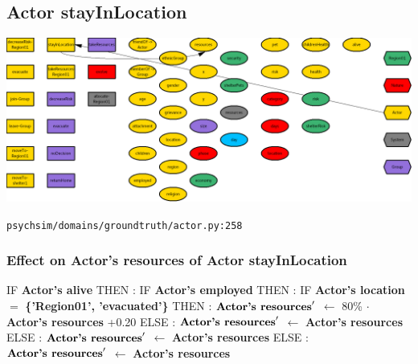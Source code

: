 \documentclass{article}%
\begin{document}
%
\subsection{Actor stayInLocation}%
\label{subsec:Actor stayInLocation}%
\includegraphics[width=\textwidth]{images/Actor-stayInLocation.png}%
\begin{flushleft}%
\verb|psychsim/domains/groundtruth/actor.py:258|%
\end{flushleft}%
\subsubsection{Effect on Actor's resources of Actor stayInLocation}%
\label{ssubsec:Effect on Actor's resources of Actor stayInLocation}%
\begin{flushleft}%
IF %
\textbf{Actor's alive}%
\linebreak%
\hspace*{2em}%
THEN %
: %
IF %
\textbf{Actor's employed}%
\linebreak%
\hspace*{4em}%
THEN %
: %
IF %
\textbf{Actor's location}%
$=$%
\textbf{\{'Region01', 'evacuated'\}}%
\linebreak%
\hspace*{6em}%
THEN %
: %
$\mbox{\textbf{Actor's resources}} '$%
$\leftarrow$%
80\%%
$\cdot$%
\textbf{Actor's resources}%
+0.20%
\linebreak%
\hspace*{6em}%
ELSE %
: %
$\mbox{\textbf{Actor's resources}} '$%
$\leftarrow$%
\textbf{Actor's resources}%
\linebreak%
\hspace*{4em}%
ELSE %
: %
$\mbox{\textbf{Actor's resources}} '$%
$\leftarrow$%
\textbf{Actor's resources}%
\linebreak%
\hspace*{2em}%
ELSE %
: %
$\mbox{\textbf{Actor's resources}} '$%
$\leftarrow$%
\textbf{Actor's resources}%
\end{flushleft}
\end{document}
